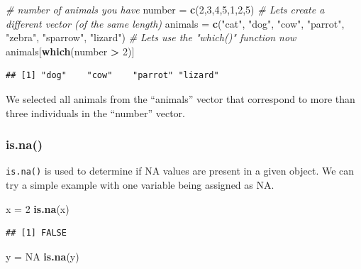 \documentclass[
]{book}
\newenvironment{Shaded}{\begin{snugshade}}{\end{snugshade}}
\newcommand{\CommentTok}[1]{\textcolor[rgb]{0.56,0.35,0.01}{\textit{#1}}}
\newcommand{\ConstantTok}[1]{\textcolor[rgb]{0.56,0.35,0.01}{#1}}
\newcommand{\DecValTok}[1]{\textcolor[rgb]{0.00,0.00,0.81}{#1}}
\newcommand{\FunctionTok}[1]{\textcolor[rgb]{0.13,0.29,0.53}{\textbf{#1}}}
\newcommand{\NormalTok}[1]{#1}
\newcommand{\OtherTok}[1]{\textcolor[rgb]{0.56,0.35,0.01}{#1}}
\newcommand{\SpecialCharTok}[1]{\textcolor[rgb]{0.81,0.36,0.00}{\textbf{#1}}}
\newcommand{\StringTok}[1]{\textcolor[rgb]{0.31,0.60,0.02}{#1}}
\begin{document}
\begin{Shaded}
\begin{Highlighting}[]
\CommentTok{\# number of animals you have}
\NormalTok{number }\OtherTok{=} \FunctionTok{c}\NormalTok{(}\DecValTok{2}\NormalTok{,}\DecValTok{3}\NormalTok{,}\DecValTok{4}\NormalTok{,}\DecValTok{5}\NormalTok{,}\DecValTok{1}\NormalTok{,}\DecValTok{2}\NormalTok{,}\DecValTok{5}\NormalTok{)}
\CommentTok{\# Let\textquotesingle{}s create a different vector (of the same length)}
\NormalTok{animals }\OtherTok{=} \FunctionTok{c}\NormalTok{(}\StringTok{"cat"}\NormalTok{, }\StringTok{"dog"}\NormalTok{, }\StringTok{"cow"}\NormalTok{, }\StringTok{"parrot"}\NormalTok{, }\StringTok{"zebra"}\NormalTok{, }\StringTok{"sparrow"}\NormalTok{, }\StringTok{"lizard"}\NormalTok{)}
\CommentTok{\# Let\textquotesingle{}s use the "which()" function now}
\NormalTok{animals[}\FunctionTok{which}\NormalTok{(number }\SpecialCharTok{\textgreater{}} \DecValTok{2}\NormalTok{)]}
\end{Highlighting}
\end{Shaded}

\begin{verbatim}
## [1] "dog"    "cow"    "parrot" "lizard"
\end{verbatim}

We selected all animals from the ``animals'' vector that correspond to more than three individuals in the ``number'' vector.

\hypertarget{is.na}{%
\subsubsection{is.na()}\label{is.na}}

\texttt{is.na()} is used to determine if NA values are present in a given object. We can try a simple example with one variable being assigned as NA.

\begin{Shaded}
\begin{Highlighting}[]
\NormalTok{x }\OtherTok{=} \DecValTok{2}
\FunctionTok{is.na}\NormalTok{(x)}
\end{Highlighting}
\end{Shaded}

\begin{verbatim}
## [1] FALSE
\end{verbatim}

\begin{Shaded}
\begin{Highlighting}[]
\NormalTok{y }\OtherTok{=} \ConstantTok{NA}
\FunctionTok{is.na}\NormalTok{(y)}
\end{Highlighting}
\end{Shaded}
\end{document}
